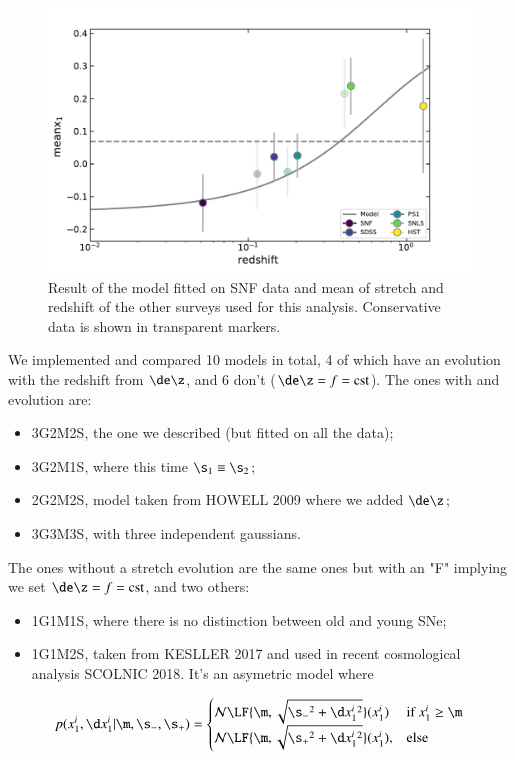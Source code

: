 \documentclass[]{aa} %
\begin{document}
\begin{figure}
    \centering
    \includegraphics[width=\linewidth]{Article_figures/stretchevol_model_maglim-cuts.pdf}
    \caption{Result of the model fitted on SNF data and mean of stretch and redshift of the other surveys used for this analysis. Conservative data is shown in transparent markers.}
    \label{fig:snf_model}
\end{figure}

We implemented and compared 10 models in total, 4 of which have an
evolution with the redshift from $\de\z$, and 6 don't ($\de\z = f =
\mathrm{cst}$). The ones with and evolution are:
\begin{itemize}
    \item 3G2M2S, the one we described (but fitted on all the data);
    \item 3G2M1S, where this time $\s_1 \equiv \s_2$;
    \item 2G2M2S, model taken from HOWELL 2009 where we added $\de\z$;
    \item 3G3M3S, with three independent gaussians.
\end{itemize}
The ones without a stretch evolution are the same ones but with an "F" implying
we set $\de\z = f = \mathrm{cst}$, and two others:
\begin{itemize}
    \item 1G1M1S, where there is no distinction between old and young SNe;
    \item 1G1M2S, taken from KESLLER 2017 and used in recent cosmological
        analysis SCOLNIC 2018. It's an asymetric model where
\end{itemize}
\begin{align}
 p(x_1^i, \d x_1^i | \m, \s_-, \s_+) = 
    \begin{cases}
        \mathcal{N} \LF{\m, \sqrt{\s_-{}^2 + \d x_1^i{}^{2}}} (x_1^i) & \text{if
        } x_1^i\geq \m\\
        \mathcal{N} \LF{\m, \sqrt{\s_+{}^2 + \d x_1^i{}^{2}}} (x_1^i), &
        \text{else}
    \end{cases}
\end{align} 
\end{document}
